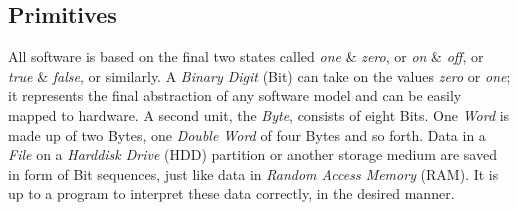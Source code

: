 %
%
%
%
%
%
%

\subsection{Primitives}
\label{primitives_heading}

All software is based on the final two states called \emph{one} \& \emph{zero},
or \emph{on} \& \emph{off}, or \emph{true} \& \emph{false}, or similarly. A
\emph{Binary Digit} (Bit) can take on the values \emph{zero} or \emph{one}; it
represents the final abstraction of any software model and can be easily mapped
to hardware. A second unit, the \emph{Byte}, consists of eight Bits. One
\emph{Word} is made up of two Bytes, one \emph{Double Word} of four Bytes and
so forth. Data in a \emph{File} on a \emph{Harddisk Drive} (HDD) partition or
another storage medium are saved in form of Bit sequences, just like data in
\emph{Random Access Memory} (RAM). It is up to a program to interpret these
data correctly, in the desired manner.

